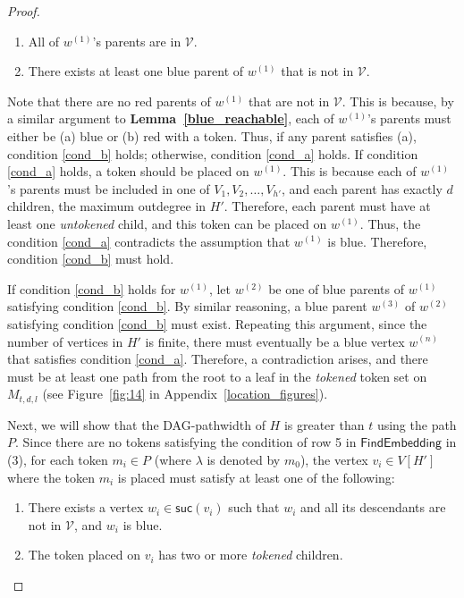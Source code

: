 \documentclass[runningheads]{llncs}
\theoremstyle{plain}
\theoremstyle{definition}
\begin{document}
\begin{proof}
\begin{enumerate}
    \item All of $w^{(1)}$'s parents are in $\mathcal{V}$. \label{cond_a}
    \item There exists at least one blue parent of $w^{(1)}$ that is not in $\mathcal{V}$. \label{cond_b}
\end{enumerate}

    Note that there are no red parents of $w^{(1)}$ that are not in $\mathcal{V}$. This is because, by a similar argument to \textbf{Lemma~\ref{blue_reachable}}, each of $w^{(1)}$'s parents must either be (a) blue or (b) red with a token. Thus, if any parent satisfies (a), condition \ref{cond_b} holds; otherwise, condition \ref{cond_a} holds. If condition \ref{cond_a} holds, a token should be placed on $w^{(1)}$. This is because each of $w^{(1)}$'s parents must be included in one of $V_1, V_2, \dots, V_{h'}$, and each parent has exactly $d$ children, the maximum outdegree in $H'$. Therefore, each parent must have at least one \textit{untokened} child, and this token can be placed on $w^{(1)}$. Thus, the condition \ref{cond_a} contradicts the assumption that $w^{(1)}$ is blue. Therefore, condition \ref{cond_b} must hold. 
    
    If condition \ref{cond_b} holds for $w^{(1)}$, let $w^{(2)}$ be one of blue parents of $w^{(1)}$ satisfying condition \ref{cond_b}. By similar reasoning, a blue parent $w^{(3)}$ of $w^{(2)}$ satisfying condition \ref{cond_b} must exist. Repeating this argument, since the number of vertices in $H'$ is finite, there must eventually be a blue vertex $w^{(n)}$ that satisfies condition \ref{cond_a}. Therefore, a contradiction arises, and there must be at least one path from the root to a leaf in the \textit{tokened} token set on $M_{t, d, l}$ (see Figure~\ref{fig:14} in Appendix~\ref{location_figures}).
    
    Next, we will show that the DAG-pathwidth of $H$ is greater than $t$ using the path $P$. Since there are no tokens satisfying the condition of row 5 in $\mathsf{FindEmbedding}$ in (3), for each token $m_i \in P$ (where $\lambda$ is denoted by $m_0$), the vertex $v_i \in V[H']$ where the token $m_i$ is placed must satisfy at least one of the following:
    
    \begin{enumerate}
        \item There exists a vertex $w_i \in \mathsf{suc}(v_i)$ such that $w_i$ and all its descendants are not in $\mathcal{V}$, and $w_i$ is blue. \label{cond1}
        \item The token placed on $v_i$ has two or more \textit{tokened} children. \label{cond2}
    \end{enumerate}
    

\end{proof}
\end{document}
